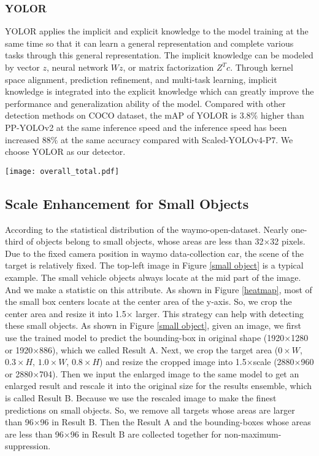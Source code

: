 \documentclass[final]{cvpr}
\begin{document}
\subsubsection{YOLOR}
YOLOR applies the implicit and explicit knowledge to the model training at the same time so that it can learn a general representation and complete various tasks through this general representation. The implicit knowledge can be modeled by vector $z$, neural network $Wz$, or matrix factorization $Z^Tc$. Through kernel space alignment, prediction refinement, and multi-task learning, implicit knowledge is integrated into the explicit knowledge which can greatly improve the performance and generalization ability of the model. Compared with other detection methods on COCO dataset, the mAP of YOLOR is 3.8$\%$ higher than PP-YOLOv2\cite{huang2021pp} at the same inference speed and the inference speed has been increased 88$\%$ at the same accuracy compared with Scaled-YOLOv4-P7\cite{wang2020scaled}. We choose YOLOR as our detector.



\begin{figure*}[t]
    \centering
    \texttt{[image: overall\_total.pdf]}
    \caption{The pipeline of our solution.}
    \label{small object}
\end{figure*}
\subsection{Scale Enhancement for Small Objects}
\label{CRE}
According to the statistical distribution of the waymo-open-dataset. Nearly one-third of objects belong to small objects, whose areas are less than 32$\times$32 pixels. Due to the fixed camera position in waymo data-collection car, the scene of the target is relatively fixed. The top-left image in Figure \ref{small object} is a typical example. The small vehicle objects always locate at the mid part of the image. And we make a statistic on this attribute. As shown in Figure \ref{heatmap}, most of the small box centers locate at the center area of the y-axis. So, we crop the center area and resize it into 1.5$\times$ larger. This strategy can help with detecting these small objects. As shown in Figure \ref{small object}, given an image, we first use the trained model to predict the bounding-box in original shape (1920$\times$1280 or 1920$\times$886), which we called Result A. Next, we crop the target area ($0\times W$, $0.3\times H$, $1.0\times W$, $0.8\times H$) and resize the cropped image into 1.5$\times$scale (2880$\times$960 or 2880$\times$704). Then we input the enlarged image to the same model to get an enlarged result and rescale it into the original size for the results ensemble, which is called Result B. Because we use the rescaled image to make the finest predictions on small objects. So, we remove all targets whose areas are larger than 96$\times$96 in Result B. Then the Result A and the bounding-boxes whose areas are less than 96$\times$96 in Result B are collected together for non-maximum-suppression. 
\end{document}
